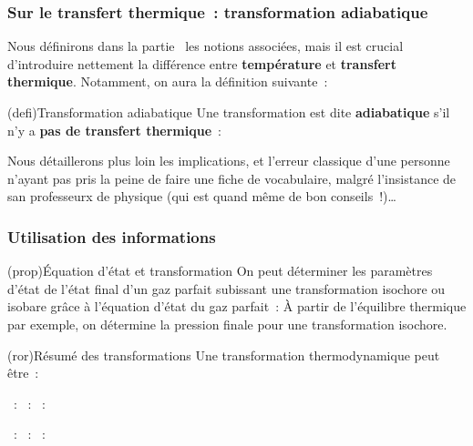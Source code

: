 \documentclass[../../main/main.tex]{subfiles}
\begin{document}
\subsubsection{Sur le transfert thermique~: transformation adiabatique}
Nous définirons dans la partie~ les notions
associées, mais il est crucial d'introduire nettement la différence entre
\textbf{température} et \textbf{transfert thermique}. Notamment, on aura la
définition suivante~:
\begin{tcb}(defi){Transformation adiabatique}
	Une transformation est dite \textbf{adiabatique} s'il n'y a \textbf{pas
		de transfert thermique}~:
	\psw{%
		\[
			\boxed{Q = 0}
		\]
	}%
	\vspace{-15pt}
\end{tcb}
Nous détaillerons plus loin les implications, et l'erreur classique d'une
personne n'ayant pas pris la peine de faire une fiche de vocabulaire, malgré
l'insistance de san professeurx de physique (qui est quand même de bon
conseils~!)…

\subsubsection{Utilisation des informations}

\begin{tcb*}(prop){Équation d'état et transformation}
	On peut déterminer les paramètres d'état de l'état final d'un gaz parfait
	subissant une transformation isochore ou isobare grâce à l'équation d'état du
	gaz parfait~:
	\psw{
		\[
			\frac{P_iV_i}{T_i} = \frac{P_fV_f}{T_f}
			\Ra
			\left\{
			\begin{array}{rclr}
				P_f & = & \DS P_i \frac{T_f}{T_i} & \quad \text{isochore}
				\\
				V_f & = & \DS V_i \frac{T_i}{T_i} & \quad \text{isobare}
			\end{array}
			\right.
		\]
	}
	À partir de l'équilibre thermique par exemple, on détermine la pression
	finale pour une transformation isochore.
\end{tcb*}

\begin{tcb*}(ror){Résumé des transformations}
	Une transformation thermodynamique peut être~:
	\smallbreak
	\begin{isd}
		\begin{itemize}
			~: 
			~: 
			~: 
		\end{itemize}
		\tcblower
		\begin{itemize}
			~: \psw{$T = \cte \Lra \dd{T} = 0$}
			~: \psw{$T\ind{ext} = \cte$}
			~: \psw{$Q = 0$}
		\end{itemize}
	\end{isd}

\end{tcb*}
\end{document}
